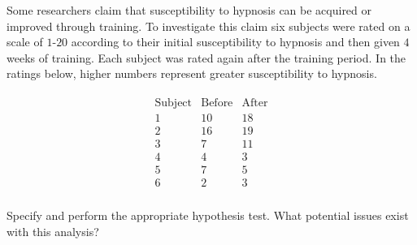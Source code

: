
\begin{exercise}[Hypnosis]

Some researchers claim that susceptibility to hypnosis can be acquired or improved through training.
To investigate this claim six subjects were rated on a scale of $1$-$20$ according to their initial susceptibility to hypnosis and then given $4$ weeks of training.
Each subject was rated again after the training period. In the ratings below, higher numbers represent greater susceptibility to hypnosis.

\begin{align*}
    \begin{array}{c|c|c}
        \hline
        \text{Subject} & \text{Before} & \text{After} \\
        \hline
        1 & 10 & 18 \\
        2 & 16 & 19 \\
        3 & 7  & 11 \\
        4 & 4  & 3  \\
        5 & 7  & 5  \\
        6 & 2  & 3  \\
    \end{array}
\end{align*}

Specify and perform the appropriate hypothesis test.
What potential issues exist with this analysis?

\end{exercise}


\begin{solution}

\phantom{}

\end{solution}

